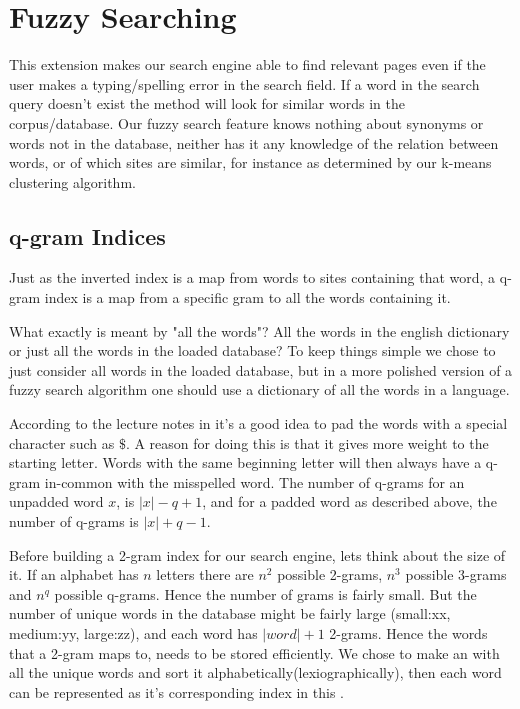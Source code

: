 \section{Fuzzy Searching}
This extension makes our search engine able to find relevant pages even if the user makes a typing/spelling error in the search field. If a word in the search query doesn't exist the  method will look for similar words in the corpus/database. 
Our fuzzy search feature knows nothing about synonyms or words not in the database, neither has it any knowledge of the relation between words, or of which sites are similar, for instance as determined by our k-means clustering algorithm.  

\subsection{q-gram Indices}
Just as the inverted index is a map from words to sites containing that word, a q-gram index is a map from a specific gram to all the words containing it. 

What exactly is meant by "all the words"? All the words in the english dictionary or just all the words in the loaded database? To keep things simple we chose to just consider all words in the loaded database, but in a more polished version of a fuzzy search algorithm one should use a dictionary of all the words in a language. 

According to the lecture notes in \cite{lectureNotes} it's a good idea to pad the words with a special character such as \(\$\). A reason for doing this is that it gives more weight to the starting letter. Words with the same beginning letter will then always have a q-gram in-common with the misspelled word. 
The number of q-grams for an unpadded word \(x\), is \(|x| - q + 1\), and for a padded word as described above, the number of q-grams is \(|x| + q - 1\).  

Before building a 2-gram index for our search engine, lets think about the size of it.
If an alphabet has \(n\) letters there are \(n^2\) possible 2-grams, \(n^3\) possible 3-grams and \(n^q\) possible q-grams. Hence the number of grams is fairly small. But the number of unique words in the database might be fairly large (small:xx, medium:yy, large:zz), and each word has \(|word| + 1\) 2-grams. Hence the words that a 2-gram maps to, needs to be stored efficiently. 
We chose to make an  with all the unique words and sort it alphabetically(lexiographically), then each word can be represented as it's corresponding index in this .

